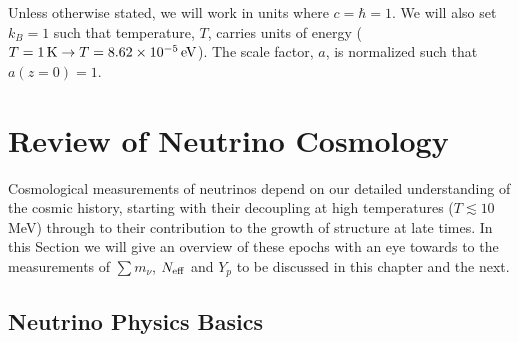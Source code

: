 Unless otherwise stated, we will work in units where $c=\hbar = 1$.  We will also set $k_B=1$ such that temperature, $T$, carries units of energy ($T = 1 \, {\rm K} \to T= 8.62 \times 10^{-5} \, {\rm eV}$).  The scale factor, $a$, is normalized such that $a(z=0) =1$.  

\section{ Review of Neutrino Cosmology}\label{sec:neureview}

Cosmological measurements of neutrinos depend on our detailed understanding of the cosmic history, starting with their decoupling at high temperatures ($T \lesssim 10$ MeV) through to their contribution to the growth of structure at late times.  In this Section we will give an overview of these epochs with an eye towards to the measurements of $\sum m_\nu$, $N_{\rm eff}$ and $Y_p$ to be discussed in this chapter and the next.  

\subsection{ Neutrino Physics Basics}

